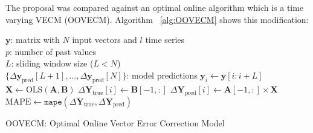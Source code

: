 

The proposal was compared against an optimal online algorithm which is a time varying
VECM (OOVECM). Algorithm ~\ref{alg:OOVECM} shows this modification:


\begin{algorithm}[ht]
\begin{algorithmic}[1]
\REQUIRE $\,$ \\
$\mathbf{y}$: matrix with $N$ input vectors and $l$ time series\\
$p$: number of past values \\
$L$: sliding window size ($L<N$) \\
\ENSURE  $\,$ \\
$\{\Delta \mathbf{y}_{\text{pred}}[L+1],\dots,\Delta \mathbf{y}_{\text{pred}}[N]\}$: model predictions 
    \STATE $\mathbf{y}_i \gets \mathbf{y}[i:i+L]$
    \STATE $\mathbf{X} \gets \text{OLS} (\mathbf{A},\mathbf{B})$%
    \STATE $\Delta \mathbf{Y}_{\text{true}}[i] \gets \mathbf{B}[-1,:]$
    \STATE $\Delta \mathbf{Y}_{\text{pred}}[i] \gets \mathbf{A}[-1,:] \times \mathbf{X}$
\ENDFOR
    \STATE $\text{MAPE} \gets \texttt{mape}(\Delta \mathbf{Y}_{\text{true}}, \Delta
    \mathbf{Y}_{\text{pred}})$
\end{algorithmic}
\caption{OOVECM: Optimal Online Vector Error Correction Model}
\label{alg:OOVECM}
\end{algorithm}


